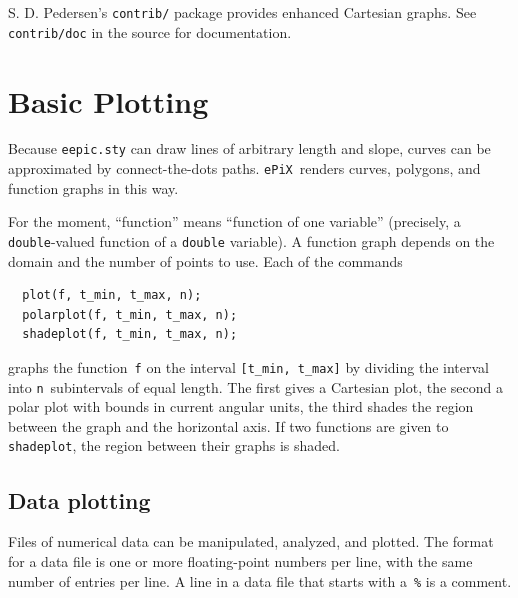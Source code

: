 \documentclass[12pt]{report}
\newcommand{\code}[1]{\texttt{#1}}
\newcommand{\filename}[1]{\texttt{#1}}
\newcommand{\ePiX}{\code{ePiX}}
\begin{document}
S. D. Pedersen's \code{contrib/} package provides enhanced Cartesian
graphs. See \code{contrib/doc} in the source for documentation.


\section{Basic Plotting}

Because \filename{eepic.sty} can draw lines of arbitrary length and
slope, curves can be approximated by connect-the-dots paths. \ePiX\ 
renders curves, polygons, and function graphs in this way.

For the moment, ``function'' means ``function of one variable''
(precisely, a \code{double}-valued function of a \code{double}
variable). A function graph depends on the domain and the number of
points to use. Each of the commands
\begin{verbatim}
  plot(f, t_min, t_max, n);
  polarplot(f, t_min, t_max, n);
  shadeplot(f, t_min, t_max, n);
\end{verbatim}
graphs the function~\code{f} on the interval \code{[t\_min, t\_max]}
by dividing the interval into \code{n}~subintervals of equal length.
The first gives a Cartesian plot, the second a polar
plot with bounds in current angular units, the
third shades the region between the graph and the horizontal axis. If
two functions are given to \code{shadeplot}, the region between their
graphs is shaded.


\subsection*{Data plotting} 

Files of numerical data can be manipulated, analyzed, and plotted.
The format for a data file is one or more floating-point numbers per
line, with the same number of entries per line. A line in a data file
that starts with a~\code{\%} is a comment. 
\end{document}
